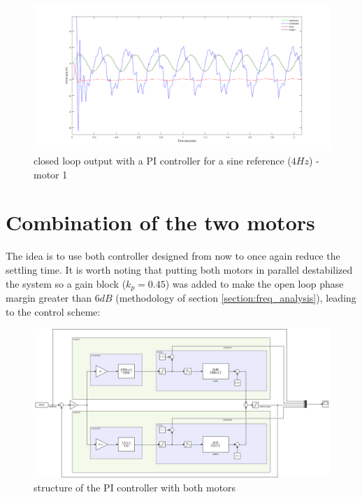 \begin{figure}
    \centering
    \includegraphics[width=\textwidth]{Pictures/sinRef_motor1.png}
    \caption{closed loop output with a PI controller for a sine reference ($4 Hz$) - motor 1}
    \label{fig:sin reference motor 1}
\end{figure}

\section{Combination of the two motors}

The idea is to use both controller designed from now to once again reduce the settling 
time. It is worth noting that putting both motors in parallel destabilized the system so a 
gain block ($k_p = 0.45$) was added to make the open loop phase margin greater than $6 dB$ (methodology of
section \ref{section:freq_analysis}), leading to the control scheme:

\begin{figure}[H]
    \centering
    \includegraphics[width=\textwidth]{Pictures/simulink_whole_controller.png}
    \caption{structure of the PI controller with both motors}
    \label{fig:structure whole PI}
\end{figure}

